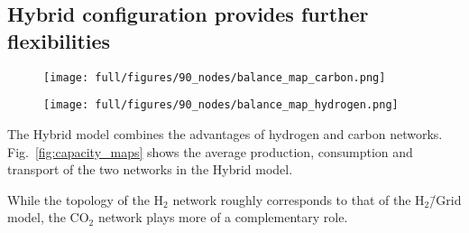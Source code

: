 \documentclass[twocolumn]{article}
\newcommand{\COtwo}{CO$_2$}
\newcommand{\Htwo}{H$_2$}
\newcommand{\modH}{H$_2$\=/Grid model}
\newcommand{\modHybrid}{Hybrid model}
\newcommand{\carbon}{CO$_2$}
\newcommand{\hydrogen}{H$_2$}
\newcommand{\hybridmodel}{Hybrid model}
\begin{document}
\subsection*{Hybrid configuration provides further flexibilities}\label{subsec:Hybrid}

\begin{figure*}[ht!]
    \centering
    \begin{subfigure}{.5\textwidth}
        \centering
        \texttt{[image: full/figures/90\_nodes/balance\_map\_carbon.png]}
        \label{fig:capacity_map_carbon_co2}
    \end{subfigure}%
    \begin{subfigure}{.5\textwidth}
        \centering
        \texttt{[image: full/figures/90\_nodes/balance\_map\_hydrogen.png]}
        \label{fig:capacity_map_hydrogen_co2}
    \end{subfigure}
    \caption{Optimal operation, flows and prices of the carbon (left) and hydrogen (right) sectors for the \hybridmodel{} in the net zero scenario. For each region, upper semicircles show the average production per technology, lower semicircles the consumption, and colors the average marginal prices. Carbon Sequestration offshore are drawn as full circles. Lines and arrows show the interregional transportation. \carbon{} from point-source in the inland either supplies local CU with imported \hydrogen{} or facilitates sequestration in nearby offshore regions.
    }
    \label{fig:capacity_maps}
\end{figure*}

The \modHybrid{} combines the advantages of hydrogen and carbon networks.
Fig.~\ref{fig:capacity_maps} shows the average production, consumption and transport of the two networks in the \modHybrid{}.


While the topology of the \Htwo{} network roughly corresponds to that of the \modH{}, the \COtwo{} network plays more of a complementary role.
\end{document}
